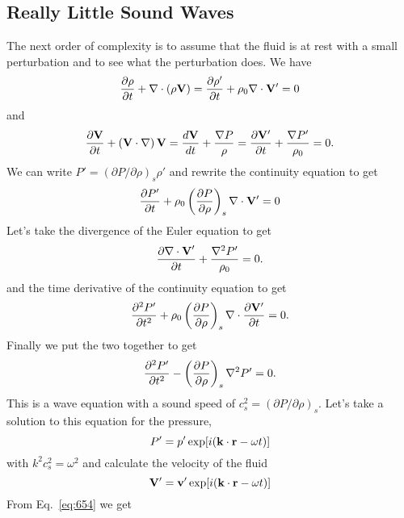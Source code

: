 \subsection{Really Little Sound Waves}
\label{sec:really-little-sound}
The next order of complexity is to assume that the fluid is at rest
with a small perturbation and to see what the perturbation does.  We
have 
\begin{equation}
\frac{\partial {\rho}}{\partial {t}} + \nabla \cdot (\rho {\bf V}) = \frac{\partial {\rho'}}{\partial {t}} + \rho_0
\nabla \cdot {\bf V}' = 0 
\label{eq:652}
\end{equation}
and 
\begin{equation}
\frac{\partial {{\bf V}}}{\partial {t}} + \left ( {\bf V} \cdot \nabla \right ) {\bf V} =
\frac{d {\bf V}}{d {t}} + \frac{\nabla P}{\rho} =
\frac{\partial {{\bf V}'}}{\partial {t}} + \frac{\nabla P'}{\rho_0} = 0.
\label{eq:653}
\end{equation}
We can write $P' = (\partial P/\partial \rho)_s \rho'$ and rewrite the
continuity equation to get
\begin{equation}
\frac{\partial {P'}}{\partial {t}} + \rho_0 \left ( \frac{\partial {P}}{\partial {\rho}} \right )_s \nabla \cdot {\bf
  V'} = 0
\label{eq:654}
\end{equation}
Let's take the divergence of the Euler equation to get
\begin{equation}
\frac{\partial {{\bf \nabla \cdot V}'}}{\partial {t}} + \frac{\nabla^2 P'}{\rho_0} = 0.
\label{eq:655}
\end{equation}
and the time derivative of the continuity equation to get
\begin{equation}
\frac{\partial {^2 P'}}{\partial {t^2}} + \rho_0 \left ( \frac{\partial {P}}{\partial {\rho}} \right )_s \nabla \cdot \frac{\partial {\bf
  V'}}{\partial {t}} = 0.
\label{eq:656}
\end{equation}
Finally we put the two together to get
\begin{equation}
\frac{\partial {^2 P'}}{\partial {t^2}} - \left ( \frac{\partial {P}}{\partial {\rho}} \right )_s \nabla^2 P' = 0.
\label{eq:657}
\end{equation}
This is a wave equation with a sound speed of $c_s^2 = (\partial
P/\partial \rho)_s$.  Let's take a solution to this equation for the
pressure,
\begin{equation}
P' = p' \exp[i({\bf k} \cdot {\bf r} - \omega t)]
\label{eq:658}
\end{equation}
with $k^2 c_s^2=  \omega^2$ and calculate the velocity of the fluid
\begin{equation}
{\bf V}' = {\bf v}' \exp[i({\bf k} \cdot {\bf r} - \omega t)]
\label{eq:659}
\end{equation}
From Eq.~\ref{eq:654} we get
